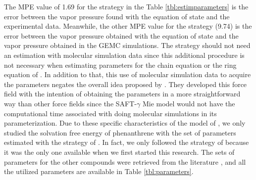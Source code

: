 The MPE value of 1.69 for the  strategy in the Table \ref{tbl:estimparameters} is the error between the vapor pressure found with the equation of state and the experimental data. Meanwhile, the other MPE value for the  strategy (9.74) is the error between the vapor pressure obtained with the equation of state and the vapor pressure obtained in the GEMC simulations. The  strategy should not need an estimation with molecular simulation data since this additional procedure is not necessary when estimating parameters for the chain equation \cite{avendano2011} or the ring equation of . In addition to that, this use of molecular simulation data to acquire the parameters negates the overall idea proposed by \cite{avendano2011}. They developed this force field with the intention of obtaining the parameters in a more straightforward way than other force fields since the SAFT-$\gamma$ Mie model would not have the computational time associated with doing molecular simulations in its parameterization. Due to these specific characteristics of the model of , we only studied the solvation free energy of phenanthrene with the set of parameters estimated with the strategy of . In fact, we only followed the strategy of  because it was the only one available when we first started this research. The sets of parameters for the other compounds were retrieved from the literature \cite{lobanova2016,herdes2015,ervik2016,muller2017}, and all the utilized parameters are available in Table \ref{tbl:parameters}.

